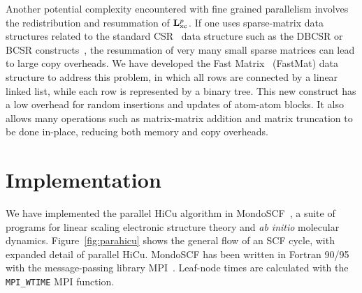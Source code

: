 \commentoutA{\documentclass[prl,aps,twocolumn,showpacs,twocolumngrid,superbib]{revtex4}}
\begin{document}
Another potential complexity encountered with fine grained parallelism
involves the redistribution and resummation of ${\bf
L}_{\mathrm{xc}}^{p}$.  If one uses sparse-matrix data structures
related to the standard CSR~\cite{FGustavson78,SPissanetzky84} data
structure such as the DBCSR or BCSR constructs~\cite{MChallacombe00B},
the resummation of very many small sparse matrices can lead to large
copy overheads.  We have developed the Fast Matrix~\cite{MChallacombe03B} 
(FastMat) data structure to address this problem, in which all rows are 
connected by a linear linked list, while each row is represented by a binary tree.
This new construct has a low overhead for random insertions and
updates of atom-atom blocks.  It also allows many operations such as
matrix-matrix addition and matrix truncation to be done in-place,
reducing both memory and copy overheads.

\section{Implementation}
\label{sec:implementation}

We have implemented the parallel HiCu algorithm in {\sc
MondoSCF}~\cite{MondoSCF}, a suite of programs for linear scaling
electronic structure theory and {\it ab initio}\/ molecular dynamics.
Figure~\ref{fig:parahicu} shows the general flow of an SCF cycle, with
expanded detail of parallel HiCu.  {\sc MondoSCF} has been written in
Fortran 90/95 with the message-passing library MPI~\cite{mpi}.
Leaf-node times are calculated with the {\tt MPI\_WTIME} MPI function.
\end{document}
